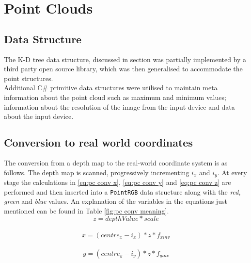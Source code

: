 \section{Point Clouds}
\label{impl:point clouds}
\subsection{Data Structure}
The K-D tree data structure, discussed in section was partially implemented by a third party open source library, which was then generalised to accommodate the point structures. \\

Additional C\# primitive data structures were utilised to maintain meta information about the point cloud such as maximum and minimum values; information about the resolution of the image from the input device and data about the input device. \\ 

\subsection{Conversion to real world coordinates}
The conversion from a depth map to the real-world coordinate system is as follows. The depth map is scanned, progressively incrementing $i_x$ and $i_y$. At every stage the calculations in \ref{eq:pc conv x}, \ref{eq:pc conv y} and \ref{eq:pc conv z} are performed and then inserted into a \texttt{PointRGB} data structure along with the \emph{red}, \emph{green} and \emph{blue} values. An explanation of the variables in the equations just mentioned can be found in Table \ref{fig:pc conv meaning}. \\

\begin{equation}
    z = depthValue * scale
    \label{eq:pc conv z}
\end{equation} \\
\begin{equation}
    x = (centre_x - i_x) * z * f_{xinv}
    \label{eq:pc conv x}
\end{equation} \\
\begin{equation}
    y = (centre_y - i_y) * z * f_{yinv}
    \label{eq:pc conv y}
\end{equation} \\

